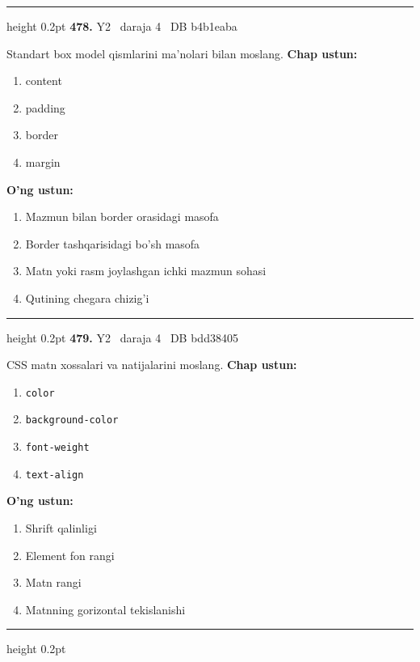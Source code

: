 \documentclass[10pt,a4paper,oneside]{article}
\begin{document}
\vspace{2mm}\hrule height 0.2pt \vspace{4mm}
\hypertarget{q478}{\textbf{\color{ink}478.}}  {\color{muted}\scriptsize Y2 \textbullet\ daraja 4 \textbullet\ DB b4b1eaba}
\par
Standart box model qismlarini ma'nolari bilan moslang.
\textbf{\footnotesize Chap ustun:}
\begin{enumerate}[label=\arabic*),leftmargin=9mm]
\item content
\item padding
\item border
\item margin
\end{enumerate}
\textbf{\footnotesize O'ng ustun:}
\begin{enumerate}[label=\Alph*),leftmargin=9mm]
\item Mazmun bilan border orasidagi masofa
\item Border tashqarisidagi bo'sh masofa
\item Matn yoki rasm joylashgan ichki mazmun sohasi
\item Qutining chegara chizig'i
\end{enumerate}
\vspace{2mm}\hrule height 0.2pt \vspace{4mm}
\hypertarget{q479}{\textbf{\color{ink}479.}}  {\color{muted}\scriptsize Y2 \textbullet\ daraja 4 \textbullet\ DB bdd38405}
\par
CSS matn xossalari va natijalarini moslang.
\textbf{\footnotesize Chap ustun:}
\begin{enumerate}[label=\arabic*),leftmargin=9mm]
\item \texttt{color}
\item \texttt{background-color}
\item \texttt{font-weight}
\item \texttt{text-align}
\end{enumerate}
\textbf{\footnotesize O'ng ustun:}
\begin{enumerate}[label=\Alph*),leftmargin=9mm]
\item Shrift qalinligi
\item Element fon rangi
\item Matn rangi
\item Matnning gorizontal tekislanishi
\end{enumerate}
\vspace{2mm}\hrule height 0.2pt \vspace{4mm}
\end{document}
